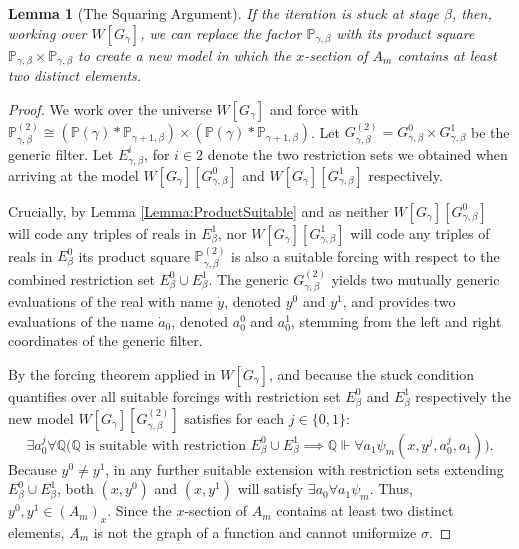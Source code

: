 \documentclass{article}
\theoremstyle{plain}
\newtheorem{lemma}[theorem]{Lemma}
\theoremstyle{definition}
\begin{document}
\begin{lemma}[The Squaring Argument]
If the iteration is stuck at stage $\beta$, then, working over $W[G_{\gamma}]$, we can replace the factor $\mathbb{P}_{\gamma, \beta}$ with its product square $\mathbb{P}_{\gamma, \beta} \times \mathbb{P}_{\gamma, \beta} $ to create a new model in which the $x$-section of $A_m$ contains at least two distinct elements.
\end{lemma}
\begin{proof}
We work over the universe $W[G_\gamma]$ and force with $\mathbb{P}_{\gamma, \beta}^{(2)} \cong (\mathbb{P}(\gamma) \ast \mathbb{P}_{\gamma+1, \beta}) \times (\mathbb{P}(\gamma) \ast \mathbb{P}_{\gamma+1, \beta})$. Let $G_{\gamma, \beta}^{(2)}=G_{\gamma,\beta}^0 \times G^1_{\gamma,\beta}$ be the generic filter. Let $E_{\gamma,\beta}^i$, for $i \in 2$ denote the two restriction sets we obtained when arriving at the model $W[G_{\gamma}][G_{\gamma,\beta}^0]$ and $W[G_{\gamma}][G_{\gamma,\beta}^1]$ respectively.

Crucially, by Lemma \ref{Lemma:ProductSuitable} and as neither $W[G_{\gamma}] [G^0_{\gamma,\beta}]$ will  code any triples of reals in $E^1_{\beta}$, nor $W[G_{\gamma}] [G^1_{\gamma,\beta}]$ will  code any triples of reals in $E^0_{\beta}$ its product square $\mathbb{P}_{\gamma, \beta}^{(2)}$ is also a  suitable forcing with respect to the combined restriction set $E^0_{\beta} \cup E^1_{\beta}$. The generic $G_{\gamma, \beta}^{(2)}$ yields two mutually generic evaluations of the real with name $\dot{y}$, denoted $y^0$ and $y^1$, and provides two evaluations of the name $\dot{a}_0$, denoted $a_0^0$ and $a_0^1$, stemming from the left and right coordinates of the generic filter.

By the forcing theorem applied in $W[G_\gamma]$, and because the stuck condition quantifies over all suitable forcings with restriction set $E^0_{\beta}$ and $E^1_{\beta}$ respectively the new model $W[G_\gamma][G_{\gamma, \beta}^{(2)}]$ satisfies for each $j \in \{0, 1\}$:
\[ \exists a_0^j \forall \mathbb{Q} \big( \mathbb{Q} \text{ is suitable with restriction } E^{0}_{\beta} \cup E^1_{\beta} \implies \mathbb{Q} \Vdash \forall a_1 \psi_m(x, y^j, a_0^j, a_1) \big). \]
Because $y^0 \neq y^1$, in any further suitable extension with restriction sets extending $E^0_{\beta} \cup E^1_{\beta}$, both $(x, y^0)$ and $(x, y^1)$ will satisfy $\exists a_0 \forall a_1 \psi_m$. Thus, $y^0, y^1 \in (A_m)_x$. Since the $x$-section of $A_m$ contains at least two distinct elements, $A_m$ is not the graph of a function and cannot uniformize $\sigma$.
\end{proof}
\end{document}
